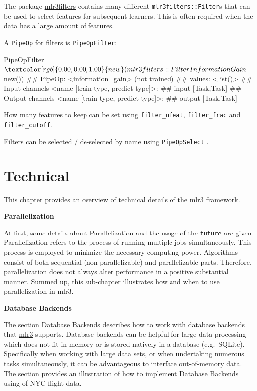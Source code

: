 \documentclass[
  11pt,
  parskip=half,
  DIV=calc,
  BCOR=10mm,
  x11names]{scrbook}
\newenvironment{Shaded}{}{}
\newcommand{\KeywordTok}[1]{\textcolor[rgb]{0.00,0.00,1.00}{#1}}
\newcommand{\NormalTok}[1]{#1}
\newcommand{\OperatorTok}[1]{#1}
\begin{document}
The package \href{https://mlr3filters.mlr-org.com}{mlr3filters} contains many different \texttt{mlr3filters::Filter}s that can be used to select features for subsequent learners.
This is often required when the data has a large amount of features.

A \texttt{PipeOp} for filters is \texttt{PipeOpFilter}:

\begin{Shaded}
\begin{Highlighting}[]
\NormalTok{PipeOpFilter}\OperatorTok{$}\KeywordTok{new}\NormalTok{(mlr3filters}\OperatorTok{::}\NormalTok{FilterInformationGain}\OperatorTok{$}\KeywordTok{new}\NormalTok{())}
\NormalTok{## PipeOp: <information_gain> (not trained)}
\NormalTok{## values: <list()>}
\NormalTok{## Input channels <name [train type, predict type]>:}
\NormalTok{##   input [Task,Task]}
\NormalTok{## Output channels <name [train type, predict type]>:}
\NormalTok{##   output [Task,Task]}
\end{Highlighting}
\end{Shaded}

How many features to keep can be set using \texttt{filter\_nfeat}, \texttt{filter\_frac} and \texttt{filter\_cutoff}.

Filters can be selected / de-selected by name using \texttt{PipeOpSelect} .

\hypertarget{technical}{%
\chapter{Technical}\label{technical}}

This chapter provides an overview of technical details of the \href{https://mlr3.mlr-org.com}{mlr3} framework.

\textbf{Parallelization}

At first, some details about \protect\hyperlink{parallelization}{Parallelization} and the usage of the \texttt{future} are given.
Parallelization refers to the process of running multiple jobs simultaneously.
This process is employed to minimize the necessary computing power.
Algorithms consist of both sequential (non-parallelizable) and parallelizable parts.
Therefore, parallelization does not always alter performance in a positive substantial manner.
Summed up, this sub-chapter illustrates how and when to use parallelization in mlr3.

\textbf{Database Backends}

The section \protect\hyperlink{backends}{Database Backends} describes how to work with database backends that \href{https://mlr3.mlr-org.com}{mlr3} supports.
Database backends can be helpful for large data processing which does not fit in memory or is stored natively in a database (e.g.~SQLite).
Specifically when working with large data sets, or when undertaking numerous tasks simultaneously, it can be advantageous to interface out-of-memory data.
The section provides an illustration of how to implement \protect\hyperlink{backends}{Database Backends} using of NYC flight data.
\end{document}
